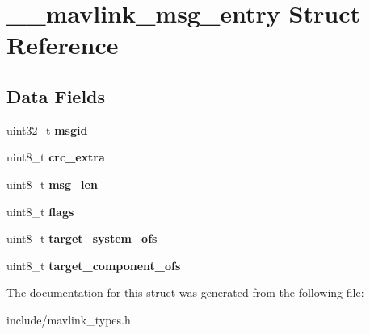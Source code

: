 \hypertarget{struct____mavlink__msg__entry}{}\section{\+\_\+\+\_\+mavlink\+\_\+msg\+\_\+entry Struct Reference}
\label{struct____mavlink__msg__entry}
\subsection*{Data Fields}
\begin{DoxyCompactItemize}
\item 
uint32\+\_\+t {\bfseries msgid}\hypertarget{struct____mavlink__msg__entry_af49c77968d6fb92b3408dd1b70763ba7}{}\label{struct____mavlink__msg__entry_af49c77968d6fb92b3408dd1b70763ba7}

\item 
uint8\+\_\+t {\bfseries crc\+\_\+extra}\hypertarget{struct____mavlink__msg__entry_a87325d40652c26090da354e364c004c5}{}\label{struct____mavlink__msg__entry_a87325d40652c26090da354e364c004c5}

\item 
uint8\+\_\+t {\bfseries msg\+\_\+len}\hypertarget{struct____mavlink__msg__entry_ab70c8f0aa1ecbe71ce56e2aa6c7b5657}{}\label{struct____mavlink__msg__entry_ab70c8f0aa1ecbe71ce56e2aa6c7b5657}

\item 
uint8\+\_\+t {\bfseries flags}\hypertarget{struct____mavlink__msg__entry_aa2585d779da0ab21273a8d92de9a0ebe}{}\label{struct____mavlink__msg__entry_aa2585d779da0ab21273a8d92de9a0ebe}

\item 
uint8\+\_\+t {\bfseries target\+\_\+system\+\_\+ofs}\hypertarget{struct____mavlink__msg__entry_a086011e6a65dec8ef70e10f8e3a95523}{}\label{struct____mavlink__msg__entry_a086011e6a65dec8ef70e10f8e3a95523}

\item 
uint8\+\_\+t {\bfseries target\+\_\+component\+\_\+ofs}\hypertarget{struct____mavlink__msg__entry_a01d3bcab10813a87b4451d0a13d7337b}{}\label{struct____mavlink__msg__entry_a01d3bcab10813a87b4451d0a13d7337b}

\end{DoxyCompactItemize}


The documentation for this struct was generated from the following file\+:\begin{DoxyCompactItemize}
\item 
include/mavlink\+\_\+types.\+h\end{DoxyCompactItemize}
